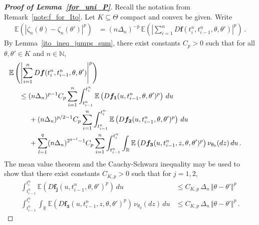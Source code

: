 \documentclass[11pt,a4paper]{article}
\newcommand{\thetan}{{\theta_0}}
\newcommand{\tminus}{{t_{i-1}^n}}
\newcommand{\tplus}{{t_i^n}}
\newcommand{\EE}{{\mathbb E}}
\newcommand{\RR}{{\mathbb R}}
\newcommand{\NN}{{\mathbb N}}
\numberwithin{equation}{section}
\numberwithin{theorem}{section}
\begin{document}
\begin{proof}[\textbf{Proof of Lemma~\ref{for_uni_P}}]
Recall the notation from Remark~\ref{note:f_for_Ito}. Let $K\subseteq \Theta$ compact and convex be given. Write
\begin{align}
\EE\left( |\zeta_n(\theta)-\zeta_n(\theta')|^p\right) &=
                                                                     (n\Delta_n)^{-p}
                                                                     \,\EE\left(\left|\sum_{i=1}^n
                                                                     D
                                                                     \bm{f}(\tplus,
                                                        \tminus, \theta, \theta')\right|^p\right)\,.
\label{general_desired_result_new}
\end{align}
%
By Lemma~\ref{ito_ineq_jumps_sum}, there exist constants
$C_p>0$  such that for all $\theta,\theta' \in K$ and $n\in\NN$, 
\begin{align}
\begin{split}
&\hspace{-5mm} \EE\left( \left| \sum_{i=1}^n D\bm{f}(\tplus,\tminus,\theta,\theta') \right|^p\right)\label{general_first_step_new}\\
&\leq  (n\Delta_n)^{p-1} C_p\sum_{i=1}^n\int_\tminus^\tplus
  \EE\left( D\bm{f_1}(u,\tminus,\theta,\theta')^p\right) \, du\\
&\hspace{5mm} + (n\Delta_n)^{p/2-1} C_p \sum_{i=1}^n
 \int_\tminus^\tplus  \EE\left(
D\bm{f_2}(u,\tminus, \theta,\theta')^{p}\right)\, du\\
&\hspace{5mm} + \sum_{l=1}^q (n\Delta_n)^{2^{q-l}-1}
 C_p \sum_{i=1}^n \int_\tminus^\tplus \int_\RR  \EE\left(
    D\bm{f_3}(u,\tminus,z, \theta,\theta')^{p}\right)
  \nu_\thetan(dz)\, du\,.
\end{split}
\end{align}
%
The mean value
theorem and the Cauchy-Schwarz inequality may be used  to show that there exist constants $C_{K,p}>0$
such that for $j=1,2$,
\begin{align}
\int_\tminus^\tplus \EE\left( D\bm{f_j}(u,\tminus, \theta,
  \theta')^p\right) \, du
&\leq C_{K,p} \,\Delta_n\,\Vert
                      \theta-\theta'\Vert^p 
\label{first_general_bound}\\
  \int_\tminus^\tplus \int_\RR \EE\left( D\bm{f_3}(u,\tminus, z, \theta,
  \theta')^p\right) \,\nu_\thetan(dz) \, du
&\leq C_{K,p} \,\Delta_n\,\Vert
                      \theta-\theta'\Vert^p \,.

\end{align}
\end{proof}
\end{document}
